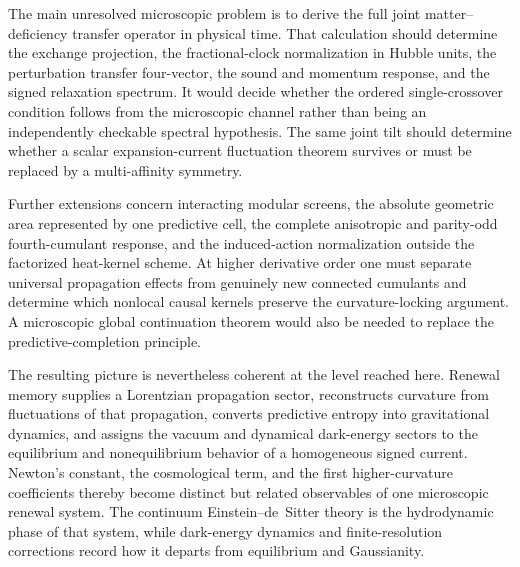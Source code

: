 \documentclass[11pt]{article}
\theoremstyle{definition}
\theoremstyle{remark}
\begin{document}
The main unresolved microscopic problem is to derive the full joint matter--deficiency transfer operator in physical time.  That calculation should determine the exchange projection, the fractional-clock normalization in Hubble units, the perturbation transfer four-vector, the sound and momentum response, and the signed relaxation spectrum.  It would decide whether the ordered single-crossover condition follows from the microscopic channel rather than being an independently checkable spectral hypothesis.  The same joint tilt should determine whether a scalar expansion-current fluctuation theorem survives or must be replaced by a multi-affinity symmetry.

Further extensions concern interacting modular screens, the absolute geometric area represented by one predictive cell, the complete anisotropic and parity-odd fourth-cumulant response, and the induced-action normalization outside the factorized heat-kernel scheme.  At higher derivative order one must separate universal propagation effects from genuinely new connected cumulants and determine which nonlocal causal kernels preserve the curvature-locking argument.  A microscopic global continuation theorem would also be needed to replace the predictive-completion principle.

The resulting picture is nevertheless coherent at the level reached here.  Renewal memory supplies a Lorentzian propagation sector, reconstructs curvature from fluctuations of that propagation, converts predictive entropy into gravitational dynamics, and assigns the vacuum and dynamical dark-energy sectors to the equilibrium and nonequilibrium behavior of a homogeneous signed current.  Newton's constant, the cosmological term, and the first higher-curvature coefficients thereby become distinct but related observables of one microscopic renewal system.  The continuum Einstein--de~Sitter theory is the hydrodynamic phase of that system, while dark-energy dynamics and finite-resolution corrections record how it departs from equilibrium and Gaussianity.
\end{document}
